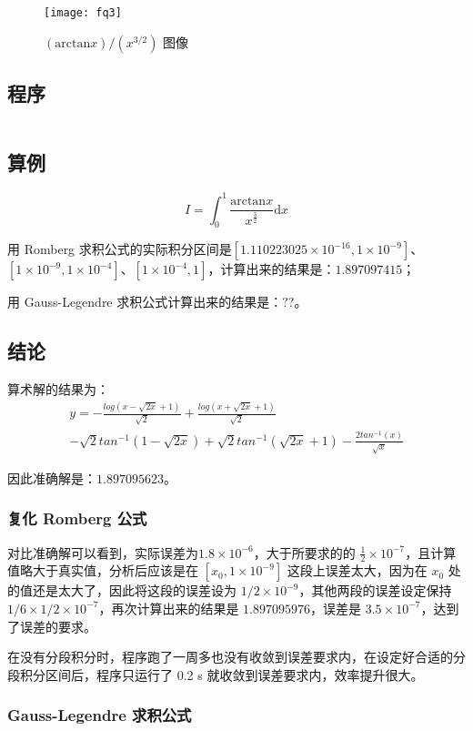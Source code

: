 \begin{figure}[ht]
    \centering
      \texttt{[image: fq3]}
      \caption{$(\mathrm{arctan}x)/(x^{3/2})$ 图像}
      \label{fig:f}
\end{figure}

\subsection{程序}

\begin{lstlisting}[style = python]

\end{lstlisting}

\subsection{算例}

\begin{equation}
    I = \int_0^1 \frac{\mathrm{arctan}x}{x^{\frac{3}{2}}} \mathrm{d}x
\end{equation}

用 Romberg 求积公式的实际积分区间是$[1.110223025\times 10^{-16},1\times 10^{-9}]$、$[1\times 10^{-9},1\times 10^{-4}]$、$[1\times 10^{-4},1]$，计算出来的结果是：$1.897097415$；

用 Gauss-Legendre 求积公式计算出来的结果是：$??$。

\subsection{结论}

算术解的结果为：
\begin{multline}
    y = -\frac{log(x - \sqrt{2x} + 1)}{\sqrt{2}} + \frac{log(x + \sqrt{2x} + 1)}{\sqrt{2}} {} \\
    - \sqrt{2} tan^{-1}(1 - \sqrt{2x}) + \sqrt{2} tan^{-1}(\sqrt{2x} + 1) - \frac{2 tan^{-1}(x)}{\sqrt{x}}
\end{multline}

因此准确解是：$1.897095623$。

\subsubsection{复化 Romberg 公式}

对比准确解可以看到，实际误差为$1.8\times 10^{-6}$，大于所要求的的 $\frac{1}{2}\times 10^{-7}$，且计算值略大于真实值，分析后应该是在 $[x_0,1\times 10^{-9}]$ 这段上误差太大，因为在 $x_0$ 处的值还是太大了，因此将这段的误差设为 $1/2\times 10^{-9}$，其他两段的误差设定保持 $1/6 \times 1/2 \times 10^{-7}$，再次计算出来的结果是 $1.897095976$，误差是 $3.5\times 10^{-7}$，达到了误差的要求。

在没有分段积分时，程序跑了一周多也没有收敛到误差要求内，在设定好合适的分段积分区间后，程序只运行了 0.2 s 就收敛到误差要求内，效率提升很大。

\subsubsection{Gauss-Legendre 求积公式}



